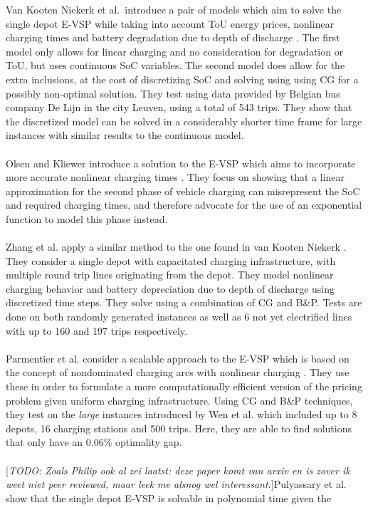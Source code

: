 \documentclass[]{article}
\newcommand{\todo}[1]{{\color{red}[\textit{TODO: #1}]}}
\begin{document}
Van Kooten Niekerk et al.\ introduce a pair of models which aim to solve the single depot E-VSP
while taking into account ToU energy prices, nonlinear charging times and
battery degradation due to depth of discharge \cite{vanKootenNiekerk2017}. The first model only allows for linear charging and no consideration for degradation or ToU, but uses continuous SoC variables. The second model does allow for the extra inclusions, at the cost of discretizing SoC and solving using using CG for a possibly non-optimal solution. They test using data provided
by Belgian bus company De Lijn in the city Leuven, using a total of 543 trips. They show that the
discretized model can be solved in a considerably shorter time frame for large instances with similar results to
the continuous model. \\\\
Olsen and Kliewer introduce a solution to the E-VSP which aims to incorporate
more accurate nonlinear charging times \cite{Olsen2020}. They focus on showing
that a linear approximation for the second phase of vehicle charging can
misrepresent the SoC and required charging times, and therefore advocate for
the use of an exponential function to model this phase instead. \\\\
Zhang et al. apply a similar method to the one found in van Kooten Niekerk
\cite{Zhang2021}. They consider a single depot with capacitated charging infrastructure,
with multiple round trip lines originating from the depot. They model
nonlinear charging behavior and battery depreciation due to depth of discharge using discretized time steps. They solve
using a combination of CG and B\&P. Tests are done on both randomly generated
instances as well as 6 not yet electrified lines with up to 160 and 197 trips
respectively.\\\\
Parmentier et al. consider a scalable approach to the E-VSP which is based on
the concept of nondominated charging arcs with nonlinear charging
\cite{Parmentier2023}. They use these in order to formulate a more
computationally efficient version of the pricing problem given uniform charging
infrastructure. Using CG and B\&P techniques, they test on the \textit{large}
instances introduced by Wen et al. \cite{Wen2016} which included up to 8
depots, 16 charging stations and 500 trips. Here, they are able to find
solutions that only have an 0.06\% optimality gap. \\\\
\todo{Zoals Philip ook al zei laatst: deze paper komt van arxiv en is zover ik weet niet peer reviewed, maar leek me alsnog wel interessant.}Pulyassary et al. show that the single depot E-VSP is solvable in polynomial time given the
\end{document}
